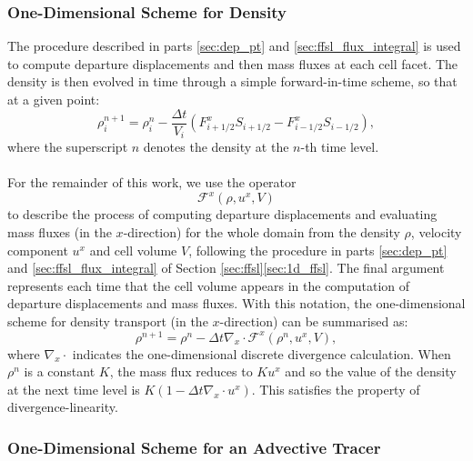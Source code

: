 \documentclass{ametsocV6.1}
\begin{document}
\subsubsection{One-Dimensional Scheme for Density} 
\label{sec:1d_density}
The procedure described in parts \ref{sec:dep_pt} and \ref{sec:ffsl_flux_integral} is used to compute departure displacements and then mass fluxes at each cell facet.
The density is then evolved in time through a simple forward-in-time scheme, so that at a given point:
\begin{equation}
\rho_i^{n+1} = \rho^n_i - \frac{\Delta t}{V_i} \left(F^x_{i+1/2}S_{i+1/2} - F^x_{i-1/2}S_{i-1/2}\right),
\end{equation}
where the superscript $n$ denotes the density at the $n$-th time level. \\
\\
For the remainder of this work, we use the operator
\begin{equation}
\mathcal{F}^x(\rho,u^{x},V)
\end{equation}
to describe the process of computing departure displacements and evaluating mass fluxes (in the $x$-direction) for the whole domain from the density $\rho$, velocity component $u^x$ and cell volume $V$, following the procedure in parts \ref{sec:dep_pt} and \ref{sec:ffsl_flux_integral} of Section \ref{sec:ffsl}\ref{sec:1d_ffsl}.
The final argument represents each time that the cell volume appears in the computation of departure displacements and mass fluxes. 
With this notation, the one-dimensional scheme for density transport (in the $x$-direction) can be summarised as:
\begin{equation}
\rho^{n+1} = \rho^n - \Delta t \nabla_x\cdot \mathcal{F}^x(\rho^n,u^{x},V),
\end{equation}
where $\nabla_x\cdot$ indicates the one-dimensional discrete divergence calculation.
When $\rho^n$ is a constant $K$, the mass flux reduces to $Ku^x$ and so the value of the density at the next time level is $K(1-\Delta t\nabla_x\cdot u^x)$. This satisfies the property of divergence-linearity.

\subsubsection{One-Dimensional Scheme for an Advective Tracer} \label{sec:1d_advect}
\end{document}
